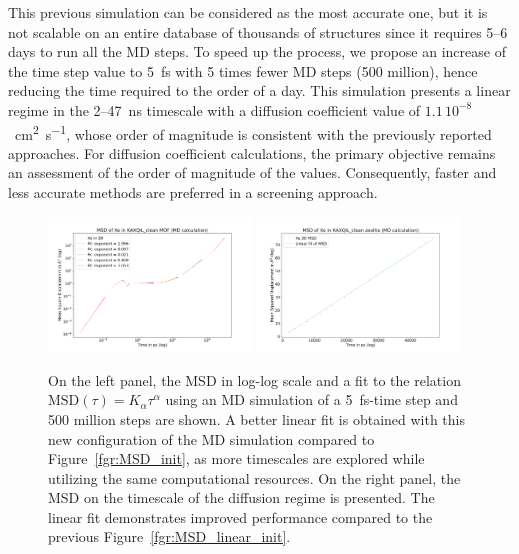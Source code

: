 \documentclass[main]{subfiles}
\begin{document}
This previous simulation can be considered as the most accurate one, but it is not scalable on an entire database of thousands of structures since it requires 5--6 days to run all the MD steps. To speed up the process, we propose an increase of the time step value to 5~\si{\fs} with 5 times fewer MD steps (500 million), hence reducing the time required to the order of a day. This simulation presents a linear regime in the {2}--{47}~\si{\ns} timescale with a diffusion coefficient value of $1.1\,10^{-8}$~\si{\square\cm\per\s}, whose order of magnitude is consistent with the previously reported approaches. For diffusion coefficient calculations, the primary objective remains an assessment of the order of magnitude of the values. Consequently, faster and less accurate methods are preferred in a screening approach.

\begin{figure}[ht]
  \centering
  \includegraphics[width=0.48\textwidth]{figures/5-diffusion/MSD_Xe_KAXQIL_clean_5fs.pdf}
  \includegraphics[width=0.48\textwidth]{figures/5-diffusion/MSD_Xe_coeff_KAXQIL_clean_5fs.pdf}
\caption{ On the left panel, the MSD in log-log scale and a fit to the relation $\text{MSD}(\tau) = K_\alpha\tau^\alpha$ using an MD simulation of a \SI{5}{\fs}-time step and 500 million steps are shown. A better linear fit is obtained with this new configuration of the MD simulation compared to Figure~\ref{fgr:MSD_init}, as more timescales are explored while utilizing the same computational resources. On the right panel, the MSD on the timescale of the diffusion regime is presented. The linear fit demonstrates improved performance compared to the previous Figure~\ref{fgr:MSD_linear_init}.}\label{fgr:MSD_5fs}
\end{figure}
\end{document}

